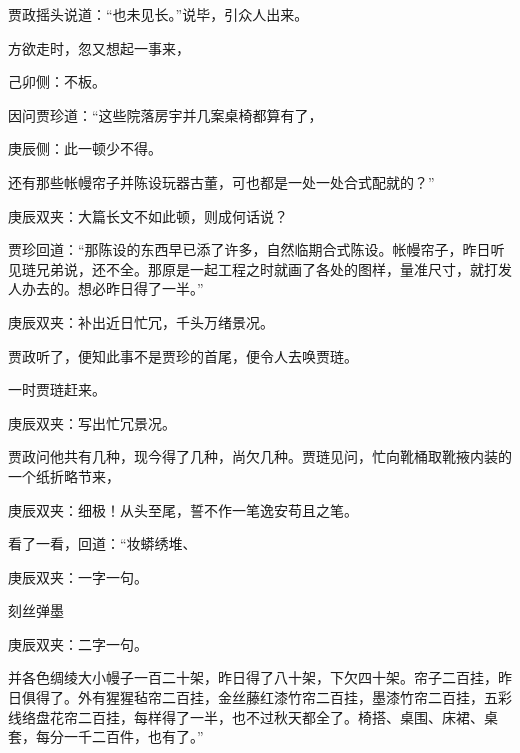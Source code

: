 \begin{parag}
    贾政摇头说道：“也未见长。”说毕，引众人出来。
\end{parag}


\begin{parag}
    方欲走时，忽又想起一事来，\begin{note}己卯侧：不板。\end{note}因问贾珍道：“这些院落房宇并几案桌椅都算有了，\begin{note}庚辰侧：此一顿少不得。\end{note}还有那些帐幔帘子并陈设玩器古董，可也都是一处一处合式配就的？”\begin{note}庚辰双夹：大篇长文不如此顿，则成何话说？\end{note}贾珍回道：“那陈设的东西早已添了许多，自然临期合式陈设。帐幔帘子，昨日听见琏兄弟说，还不全。那原是一起工程之时就画了各处的图样，量准尺寸，就打发人办去的。想必昨日得了一半。”\begin{note}庚辰双夹：补出近日忙冗，千头万绪景况。\end{note}贾政听了，便知此事不是贾珍的首尾，便令人去唤贾琏。
\end{parag}


\begin{parag}
    一时贾琏赶来。\begin{note}庚辰双夹：写出忙冗景况。\end{note}贾政问他共有几种，现今得了几种，尚欠几种。贾琏见问，忙向靴桶取靴掖内装的一个纸折略节来，\begin{note}庚辰双夹：细极！从头至尾，誓不作一笔逸安苟且之笔。\end{note}看了一看，回道：“妆蟒绣堆、\begin{note}庚辰双夹：一字一句。\end{note}刻丝弹墨\begin{note}庚辰双夹：二字一句。\end{note}并各色绸绫大小幔子一百二十架，昨日得了八十架，下欠四十架。帘子二百挂，昨日俱得了。外有猩猩毡帘二百挂，金丝藤红漆竹帘二百挂，墨漆竹帘二百挂，五彩线络盘花帘二百挂，每样得了一半，也不过秋天都全了。椅搭、桌围、床裙、桌套，每分一千二百件，也有了。”
\end{parag}



